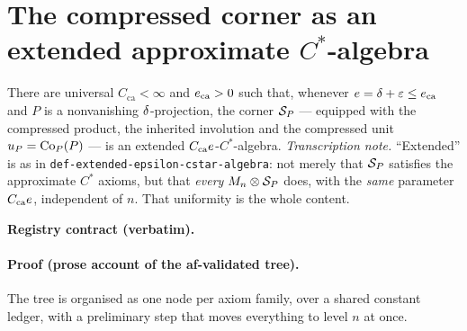 \section{The compressed corner as an extended approximate \texorpdfstring{$C^*$}{C*}-algebra}\label{sec:compcb-corner-algebra}

\begin{lemma}\label{lem:compcb-corner-algebra}
There are universal $C_{\mathrm{ca}}<\infty$ and $e_{\mathrm{ca}}>0$ such that,
whenever $e=\delta+\varepsilon\le e_{\mathrm{ca}}$ and $P$ is a nonvanishing
$\delta$-projection, the corner $\mathcal S_{P}$ --- equipped with the compressed product, the
inherited involution and the compressed unit $u_{P}=\mathrm{Co}_{P}(P)$ --- is an extended
$C_{\mathrm{ca}}e$-$C^*$-algebra.
\emph{Transcription note.} ``Extended'' is as in
\texttt{def-extended-epsilon-cstar-algebra}: not merely that $\mathcal S_{P}$ satisfies the
approximate $C^*$ axioms, but that \emph{every} $M_{n}\otimes \mathcal S_{P}$ does, with the
\emph{same} parameter $C_{\mathrm{ca}}e$, independent of $n$. That uniformity is the
whole content.
\end{lemma}

\noindent\textbf{Registry contract (verbatim).}

\paragraph{Proof (prose account of the af-validated tree).}
The tree is organised as one node per axiom family, over a shared constant ledger, with a
preliminary step that moves everything to level $n$ at once.

